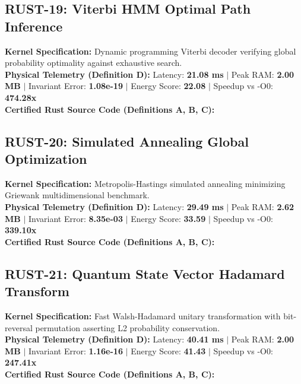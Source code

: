 \subsection{RUST-19: Viterbi HMM Optimal Path Inference}
\textbf{Kernel Specification:} Dynamic programming Viterbi decoder verifying global probability optimality against exhaustive search.\\
\textbf{Physical Telemetry (Definition D):} Latency: \textbf{21.08 ms} $|$ Peak RAM: \textbf{2.00 MB} $|$ Invariant Error: \textbf{1.08e-19} $|$ Energy Score: \textbf{22.08} $|$ Speedup vs -O0: \textbf{474.28x}\\

\textbf{Certified Rust Source Code (Definitions A, B, C):}


\vspace{1em}
\subsection{RUST-20: Simulated Annealing Global Optimization}
\textbf{Kernel Specification:} Metropolis-Hastings simulated annealing minimizing Griewank multidimensional benchmark.\\
\textbf{Physical Telemetry (Definition D):} Latency: \textbf{29.49 ms} $|$ Peak RAM: \textbf{2.62 MB} $|$ Invariant Error: \textbf{8.35e-03} $|$ Energy Score: \textbf{33.59} $|$ Speedup vs -O0: \textbf{339.10x}\\

\textbf{Certified Rust Source Code (Definitions A, B, C):}


\vspace{1em}
\subsection{RUST-21: Quantum State Vector Hadamard Transform}
\textbf{Kernel Specification:} Fast Walsh-Hadamard unitary transformation with bit-reversal permutation asserting L2 probability conservation.\\
\textbf{Physical Telemetry (Definition D):} Latency: \textbf{40.41 ms} $|$ Peak RAM: \textbf{2.00 MB} $|$ Invariant Error: \textbf{1.16e-16} $|$ Energy Score: \textbf{41.43} $|$ Speedup vs -O0: \textbf{247.41x}\\

\textbf{Certified Rust Source Code (Definitions A, B, C):}


